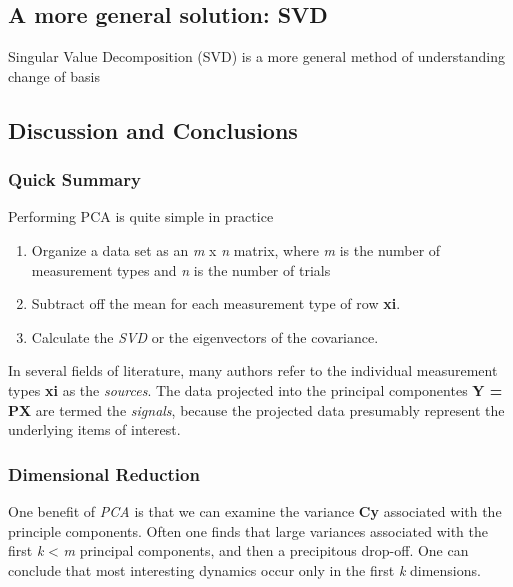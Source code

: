 \hypertarget{a-more-general-solution-svd}{%
\subsection{A more general solution:
SVD}\label{a-more-general-solution-svd}}

Singular Value Decomposition (SVD) is a more general method of
understanding change of basis

\hypertarget{discussion-and-conclusions}{%
\subsection{Discussion and
Conclusions}\label{discussion-and-conclusions}}

\hypertarget{quick-summary}{%
\subsubsection{Quick Summary}\label{quick-summary}}

Performing PCA is quite simple in practice

\begin{enumerate}
\def\labelenumi{\arabic{enumi}.}
\item
  Organize a data set as an \emph{m} x \emph{n} matrix, where \emph{m}
  is the number of measurement types and \emph{n} is the number of
  trials
\item
  Subtract off the mean for each measurement type of row \textbf{xi}.
\item
  Calculate the \emph{SVD} or the eigenvectors of the covariance.
\end{enumerate}

In several fields of literature, many authors refer to the individual
measurement types \textbf{xi} as the \emph{sources}. The data projected
into the principal componentes \textbf{Y = PX} are termed the
\emph{signals}, because the projected data presumably represent the
underlying items of interest.

\hypertarget{dimensional-reduction}{%
\subsubsection{Dimensional Reduction}\label{dimensional-reduction}}

One benefit of \emph{PCA} is that we can examine the variance
\textbf{Cy} associated with the principle components. Often one finds
that large variances associated with the first \emph{k} \textless{}
\emph{m} principal components, and then a precipitous drop-off. One can
conclude that most interesting dynamics occur only in the first \emph{k}
dimensions.

